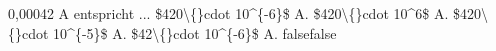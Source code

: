    {0,00042 A entspricht ...}
    {\$420\textbackslash\{\}cdot 10\textasciicircum{}\{-6\}\$ A.}
    {\$420\textbackslash\{\}cdot 10\textasciicircum{}6\$ A.}
    {\$420\textbackslash\{\}cdot 10\textasciicircum{}\{-5\}\$ A.}
    {\$42\textbackslash\{\}cdot 10\textasciicircum{}\{-6\}\$ A.}
    {false}{false}